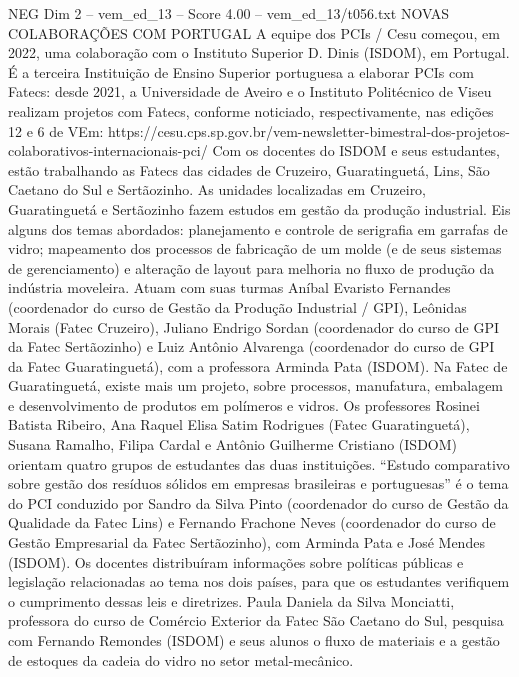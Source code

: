 \begin{textsample}{NEG Dim 2 – vem\_ed\_13 – Score 4.00 – vem\_ed\_13/t056.txt}  \label{ex:f2_neg_111}
NOVAS COLABORAÇÕES COM PORTUGAL A equipe dos PCIs / Cesu começou, em 2022, uma colaboração com o Instituto Superior D.
Dinis (ISDOM), em Portugal.
É a terceira Instituição de Ensino Superior portuguesa a elaborar PCIs com Fatecs: desde 2021, a Universidade de Aveiro e o Instituto Politécnico de Viseu realizam projetos com Fatecs, conforme noticiado, respectivamente, nas edições 12 e 6 de VEm: https://cesu.cps.sp.gov.br/vem-newsletter-bimestral-dos-projetos-colaborativos-internacionais-pci/ Com os docentes do ISDOM e seus estudantes, estão trabalhando as Fatecs das cidades de Cruzeiro, Guaratinguetá, Lins, São Caetano do Sul e Sertãozinho.
As unidades localizadas em Cruzeiro, Guaratinguetá e Sertãozinho fazem estudos em gestão da produção industrial.
Eis alguns dos temas abordados: planejamento e controle de serigrafia em garrafas de vidro; mapeamento dos processos de fabricação de um molde (e de seus sistemas de gerenciamento) e alteração de layout para melhoria no fluxo de produção da indústria moveleira.
Atuam com suas turmas Aníbal Evaristo Fernandes (coordenador do curso de Gestão da Produção Industrial / GPI), Leônidas Morais (Fatec Cruzeiro), Juliano Endrigo Sordan (coordenador do curso de GPI da Fatec Sertãozinho) e Luiz Antônio Alvarenga (coordenador do curso de GPI da Fatec Guaratinguetá), com a professora Arminda Pata (ISDOM).
Na Fatec de Guaratinguetá, existe mais um projeto, sobre processos, manufatura, embalagem e desenvolvimento de produtos em polímeros e vidros.
Os professores Rosinei Batista Ribeiro, Ana Raquel Elisa Satim Rodrigues (Fatec Guaratinguetá), Susana Ramalho, Filipa Cardal e Antônio Guilherme Cristiano (ISDOM) orientam quatro grupos de estudantes das duas instituições. “Estudo comparativo sobre gestão dos resíduos sólidos em empresas brasileiras e portuguesas” é o tema do PCI conduzido por Sandro da Silva Pinto (coordenador do curso de Gestão da Qualidade da Fatec Lins) e Fernando Frachone Neves (coordenador do curso de Gestão Empresarial da Fatec Sertãozinho), com Arminda Pata e José Mendes (ISDOM).
Os docentes distribuíram informações sobre políticas públicas e legislação relacionadas ao tema nos dois países, para que os estudantes verifiquem o cumprimento dessas leis e diretrizes.
Paula Daniela da Silva Monciatti, professora do curso de Comércio Exterior da Fatec São Caetano do Sul, pesquisa com Fernando Remondes (ISDOM) e seus alunos o fluxo de materiais e a gestão de estoques da cadeia do vidro no setor metal-mecânico.

\end{textsample}
